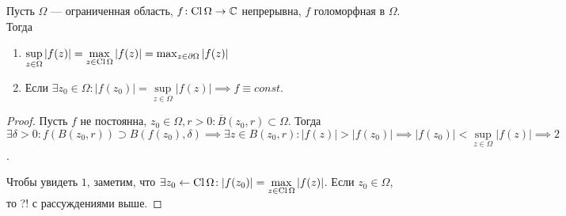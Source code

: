 \begin{consequence}
   Пусть  $\Omega$ --- ограниченная область,  $f\!: \operatorname{Cl} \Omega \to \mathbb{C}$ непрерывна,  $f$ голоморфная в  $\Omega$. Тогда
   \begin{enumerate}
       \item $\sup\limits_{z \in \Omega} |f(z)| = \max\limits_{z \in \operatorname{Cl} \Omega} |f(z)| = \max_{z \in \partial \Omega} |f(z)|$
       \item Если $\exists z_0 \in \Omega\!: |f(z_0)| = \sup\limits_{z \in \Omega} |f(z)| \implies f \equiv const$.
   \end{enumerate}
\end{consequence}
\begin{proof}
    Пусть $f$ не постоянна,  $z_0 \in \Omega, r > 0\!: \overline{B}(z_0, r) \subset \Omega$. Тогда $\exists \delta > 0\!: f(B(z_0, r)) \supset B(f(z_0), \delta) \implies \exists z \in B(z_0, r)\!: |f(z)| > |f(z_0)| \implies |f(z_0)| < \sup\limits_{z \in \Omega} |f(z)| \implies 2$.

    Чтобы увидеть $1$, заметим, что  $\exists z_0 \leftarrow \operatorname{Cl} \Omega\!: |f(z_0)| = \max\limits_{z \in \operatorname{Cl} \Omega} |f(z)|$. Если $z_0 \in \Omega$, то ?! с рассуждениями выше.
\end{proof}
